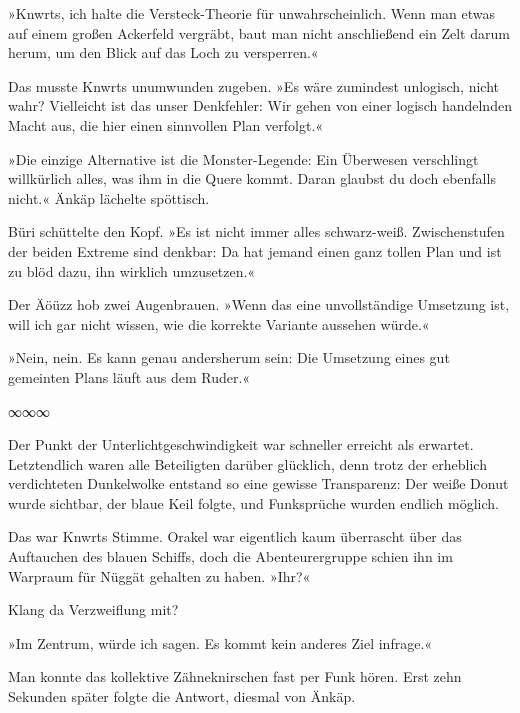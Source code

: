 »Knwrts, ich halte die Versteck-Theorie für unwahrscheinlich. Wenn man etwas auf einem großen Ackerfeld vergräbt, baut man nicht anschließend ein Zelt darum herum, um den Blick auf das Loch zu versperren.«

Das musste Knwrts unumwunden zugeben. »Es wäre zumindest unlogisch, nicht wahr? Vielleicht ist das unser Denkfehler: Wir gehen von einer logisch handelnden Macht aus, die hier einen sinnvollen Plan verfolgt.«

»Die einzige Alternative ist die Monster-Legende: Ein Überwesen verschlingt willkürlich alles, was ihm in die Quere kommt. Daran glaubst du doch ebenfalls nicht.« Änkäp lächelte spöttisch.

Büri schüttelte den Kopf. »Es ist nicht immer alles schwarz-weiß. Zwischenstufen der beiden Extreme sind denkbar: Da hat jemand einen ganz tollen Plan und ist zu blöd dazu, ihn wirklich umzusetzen.«

Der Äöüzz hob zwei Augenbrauen. »Wenn das eine unvollständige Umsetzung ist, will ich gar nicht wissen, wie die korrekte Variante aussehen würde.«

»Nein, nein. Es kann genau andersherum sein: Die Umsetzung eines gut gemeinten Plans läuft aus dem Ruder.«

\begin{center}
∞∞∞
\end{center}

Der Punkt der Unterlichtgeschwindigkeit war schneller erreicht als erwartet. Letztendlich waren alle Beteiligten darüber glücklich, denn trotz der erheblich verdichteten Dunkelwolke entstand so eine gewisse Transparenz: Der weiße Donut wurde sichtbar, der blaue Keil folgte, und Funksprüche wurden endlich möglich.


Das war Knwrts Stimme. Orakel war eigentlich kaum überrascht über das Auftauchen des blauen Schiffs, doch die Abenteurergruppe schien ihn im Warpraum für Nüggät gehalten zu haben. »Ihr?«

 Klang da Verzweiflung mit?

»Im Zentrum, würde ich sagen. Es kommt kein anderes Ziel infrage.«

Man konnte das kollektive Zähneknirschen fast per Funk hören. Erst zehn Sekunden später folgte die Antwort, diesmal von Änkäp. 

